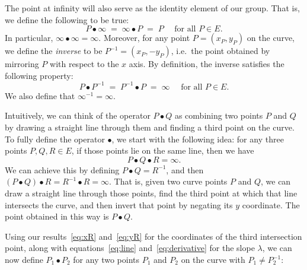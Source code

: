 \documentclass[manuscript]{acmart}
\begin{document}
The point at infinity will also serve as the identity element of our group.
That is, we define the following to be true:
\begin{equation}
P \bullet \infty \;=\; \infty \bullet P \;=\; P \quad\text{ for all } P \in E. \label{eq:law-identity}
\end{equation}
In particular, $\infty\bullet\infty=\infty$.
Moreover, for any point $P = (x_P, y_P)$ on the curve, we define the \emph{inverse} to be $P^{-1} = (x_P, -y_P)$, i.e.\ the point obtained by mirroring $P$ with respect to the $x$ axis.
By definition, the inverse satisfies the following property:
\begin{equation}
P \bullet P^{-1} \;=\; P^{-1} \bullet P \;=\; \infty \quad\text{ for all } P \in E. \label{eq:law-inverse}
\end{equation}
We also define that $\infty^{-1} = \infty$.

Intuitively, we can think of the operator $P \bullet Q$ as combining two points $P$ and $Q$ by drawing a straight line through them and finding a third point on the curve.
To fully define the operator $\bullet$, we start with the following idea: for any three points $P, Q, R \in E$, if those points lie on the same line, then we have
\begin{equation}
P \bullet Q \bullet R = \infty.
\end{equation}
We can achieve this by defining $P \bullet Q = R^{-1}$, and then $(P \bullet Q) \bullet R = R^{-1} \bullet R = \infty$.
That is, given two curve points $P$ and $Q$, we can draw a straight line through those points, find the third point at which that line intersects the curve, and then invert that point by negating its $y$ coordinate.
The point obtained in this way is $P \bullet Q$.

Using our results~\eqref{eq:xR} and~\eqref{eq:yR} for the coordinates of the third intersection point, along with equations~\eqref{eq:line} and~\eqref{eq:derivative} for the slope $\lambda$, we can now define $P_1 \bullet P_2$ for any two points $P_1$ and $P_2$ on the curve with $P_1 \neq P_2^{-1}$:
\end{document}
